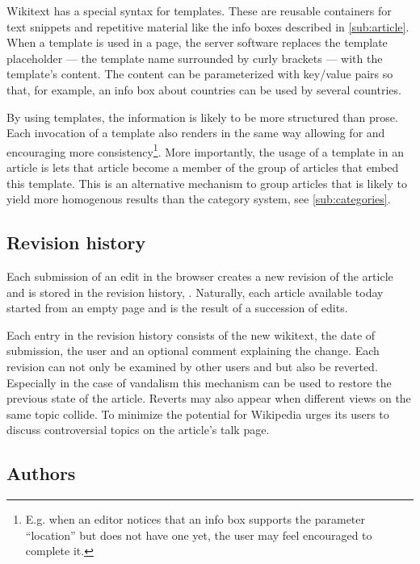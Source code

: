 Wikitext has a special syntax for templates. 
These are reusable containers for text snippets and repetitive material like the info boxes described in \ref{sub:article}.
When a template is used in a page, the server software replaces the template placeholder --- the template name surrounded by curly brackets --- with the template's content.
The content can be parameterized with key/value pairs so that, for example, an info box about countries can be used by several countries.

By using templates, the information is likely to be more structured than prose.
Each invocation of a template also renders in the same way allowing for and encouraging more consistency\footnote{E.g. when an editor notices that an info box supports the parameter ``location'' but does not have one yet, the user may feel encouraged to complete it.}.
More importantly, the usage of a template in an article is lets that article become a member of the group of articles that embed this template.
This is an alternative mechanism to group articles that is likely to yield more homogenous results than the category system, see \ref{sub:categories}.

\subsection{Revision history}

Each submission of an edit in the browser creates a new revision of the article and is stored in the revision history, .
Naturally, each article available today started from an empty page and is the result of a succession of edits.


Each entry in the revision history consists of the new wikitext, the date of submission, the user and an optional comment explaining the change.
Each revision can not only be examined by other users and but also be reverted. 
Especially in the case of vandalism this mechanism can be used to restore the previous state of the article.
Reverts may also appear when different views on the same topic collide.
To minimize the potential for \cite{suh2007us} Wikipedia urges its users to discuss controversial topics on the article's talk page.

\subsection{Authors}

